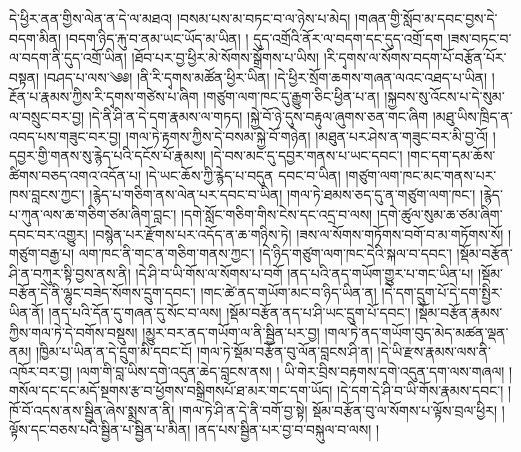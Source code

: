 དེ་ཕྱིར་ནན་གྱིས་ལེན་ན་དེ་ལ་མཐའ། །བསམ་པས་མ་བཏང་བ་ལ་ཉེས་པ་མེད། །གཞན་གྱི་སློབ་མ་དབང་བྱས་དེ་བདག་མིན། །བདག་ཉིད་རྐུ་བ་ནམ་ཡང་ཡོད་མ་ཡིན། ། དུད་འགྲོའི་ནོར་ལ་བདག་དང་དུད་འགྲོ་དག །ཟས་བཏང་བ་ལ་བདག་ནི་དུད་འགྲོ་ཡིན། །ཐོབ་པར་བྱ་ཕྱིར་མེ་སོགས་སྒྲོགས་པ་ཡིས། །རི་དྭགས་ལ་སོགས་བདག་པོ་བརྩོན་པོར་བསྟན། །བཤད་པ་ལས་༄༅། །ནི་རི་དྭགས་མཚོན་ཕྱིར་ཡིན། །དེ་ཕྱིར་སྲོག་ཆགས་གཞན་ལའང་འཐད་པ་ཡིན། །རྔོན་པ་རྣམས་ཀྱིས་རི་དྭགས་གཙེས་པ་ཞིག །གཙུག་ལག་ཁང་དུ་རྒྱུག་ཅིང་ཕྱིན་པ་ན། །སྐྱབས་སུ་འོངས་པ་དེ་སུམ་ལ་བསྲུང་བར་བྱ། །དེ་ནི་ཤི་ན་དེ་དག་རྣམས་ལ་གཏད། །སྐྱེ་བོ་ཉེ་དུས་བརྟུལ་ཞུགས་ཅན་གང་ཞིག །མཐུ་ཡིས་ཁྲིད་ན་འབད་པས་གཟུང་བར་བྱ། །གལ་ཏེ་རྟགས་ཀྱིས་དེ་བསམ་སྐྱེ་བོ་གཉེན། །མཐུན་པར་ཤེས་ན་གཟུང་བར་མི་བྱ་འོ། །དབྱར་གྱི་གནས་སུ་རྙེད་པའི་དངོས་པོ་རྣམས། །དེ་བས་མང་དུ་དབྱར་གནས་པ་ཡང་དབང་། །གང་དག་དམ་ཆོས་ཚིགས་བཅད་འགའ་འདོན་པ། །དེ་ཡང་ཆོས་ཀྱི་རྙེད་པ་བདུན དབང་བ་ཡིན། །གཙུག་ལག་ཁང་མང་གནས་པར་ཁས་བླངས་ཀྱང་། །རྙེད་པ་གཅིག་ནས་ལེན་པར་དབང་བ་ཡིན། །གལ་ཏེ་ཐམས་ཅད་དུ་ན་གཙུག་ལག་ཁང་། །རྙེད་པ་ཀུན་ལས་ཆ་གཅིག་ཙམ་ཞིག་བླང་། །དགེ་སློང་གཅིག་གིས་ངེས་དང་འདྲ་བ་ལས། །དགེ་ཚུལ་སུམ་ཆ་ཙམ་ཞིག་དབང་བར་འགྱུར། །བསྙེན་པར་རྫོགས་པར་འདོད་ན་ཆ་གཉིས་ཏེ། །ཟས་ལ་སོགས་གཏོགས་བགོ་བ་མ་གཏོགས་སོ། །གཙུག་བརྒྱ་པ། ལག་ཁང་ནི་གང་ན་གཅིག་གནས་ཀྱང་། །དེ་ཉིད་གཙུག་ལག་ཁང་དེའི་སྐལ་བ་དབང་། །སྡོམ་བརྩོན་ཤི་ན་བཀུར་སྟི་བྱས་ནས་ནི། །དེ་ཤི་བ་ཡི་གོས་ལ་སོགས་པ་བགོ །ནད་པའི་ནད་གཡོག་གྱུར་པ་གང་ཡིན་པ། །སྡོམ་བརྩོན་དེ་ནི་ལྷུང་བཟེད་སོགས་དྲུག་དབང་། །གང་ཚེ་ནད་གཡོག་མང་བ་ཉིད་ཡིན་ན། །དེ་དག་དྲུག་པོ་དེ་དག་སྤྱིར་ཡིན་ནོ། །ནད་པའི་དོན་དུ་གཞན་དུ་སོང་བ་ལས། །སྡོམ་བརྩོན་ནད་པ་ཤི་ཡང་དྲུག་པོ་དབང་། །སྡོམ་བརྩོན་རྣམས་ཀྱིས་གལ་ཏེ་དེ་བགོས་བསྡུས། །མྱུར་བར་ནད་གཡོག་ལ་ནི་སྦྱིན་པར་བྱ། །གལ་ཏེ་ནད་གཡོག་བུད་མེད་མཚན་ལྡན་ནམ། །ཁྱིམ་པ་ཡིན་ན་དེ་དྲུག་མི་དབང་ངོ། །གལ་ཏེ་སྡོམ་བརྩོན་བུ་ལོན་བླངས་ཤི་ན། །དེ་ཡི་རྫས་རྣམས་ལས་ནི་འཁོར་བར་བྱ། །ལག་གི་བླ་ཡིས་དགེ་འདུན་ཆེད་བླངས་ནས། ། ཡི་གེར་བྲིས་བརྟགས་དགེ་འདུན་དག་ལས་གཞལ། །གསོལ་དང་དང་མདོ་སྔགས་རྩ་བ་ཕྱོགས་བསྒྲིགསཔོ་ཐ་མར་གང་དག་ཡོད། །དེ་དག་དེ་ཤི་བ་ཡི་གོས་རྣམས་དབང་། །ཁོ་བོ་འདས་ནས་སྦྱིན་ཞེས་སྨྲས་ན་ནི། །གལ་ཏེ་ཤི་ན་དེ་ནི་བགོ་བྱ་སྟེ། སྡོམ་བརྩོན་བུ་ལ་སོགས་པ་ལྟོས་བྲལ་ཕྱིར། །ལྟོས་དང་བཅས་པའི་སྦྱིན་པ་སྦྱིན་པ་མིན། །ནད་པས་སྦྱིན་པར་བྱ་བ་བསྐུལ་བ་ལས། །
